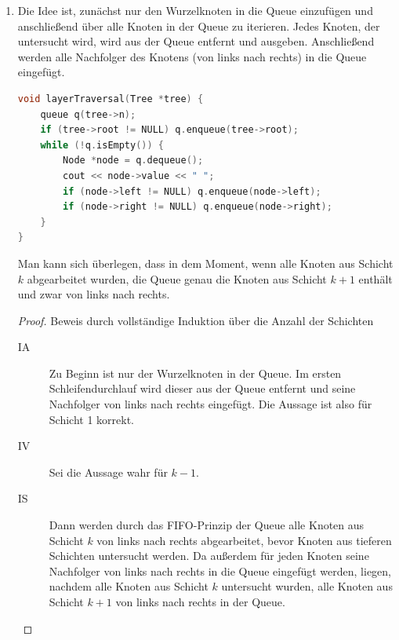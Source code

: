 \documentclass[11pt,a4paper]{article}
\begin{document}
\begin{loesung}
\begin{enumerate}
        \item Die Idee ist, zunächst nur den Wurzelknoten in die Queue einzufügen und anschließend über alle Knoten in der Queue zu iterieren.
        Jedes Knoten, der untersucht wird, wird aus der Queue entfernt und ausgeben.
        Anschließend werden alle Nachfolger des Knotens (von links nach rechts) in die Queue eingefügt.
        \begin{lstlisting}[language=c++]
void layerTraversal(Tree *tree) {
    queue q(tree->n);
    if (tree->root != NULL) q.enqueue(tree->root);
    while (!q.isEmpty()) {
        Node *node = q.dequeue();
        cout << node->value << " ";
        if (node->left != NULL) q.enqueue(node->left);
        if (node->right != NULL) q.enqueue(node->right);
    }
}            
        \end{lstlisting}
        Man kann sich überlegen, dass in dem Moment, wenn alle Knoten aus Schicht $k$ abgearbeitet wurden, die Queue genau die Knoten aus Schicht $k + 1$ enthält und zwar von links nach rechts.
        \begin{proof}
            Beweis durch vollständige Induktion über die Anzahl der Schichten
            \begin{description}
                \item[IA] Zu Beginn ist nur der Wurzelknoten in der Queue.
                Im ersten Schleifendurchlauf wird dieser aus der Queue entfernt und seine Nachfolger von links nach rechts eingefügt.
                Die Aussage ist also für Schicht 1 korrekt. 
                \item[IV] Sei die Aussage wahr für $k - 1$.
                \item[IS]
                Dann werden durch das FIFO-Prinzip der Queue alle Knoten aus Schicht $k$ von links nach rechts abgearbeitet, bevor Knoten aus tieferen Schichten untersucht werden.
                Da außerdem für jeden Knoten seine Nachfolger von links nach rechts in die Queue eingefügt werden, liegen, nachdem alle Knoten aus Schicht $k$ untersucht wurden, alle Knoten aus Schicht $k + 1$ von links nach rechts in der Queue.

\end{description}
\end{proof}
\end{enumerate}
\end{loesung}
\end{document}
